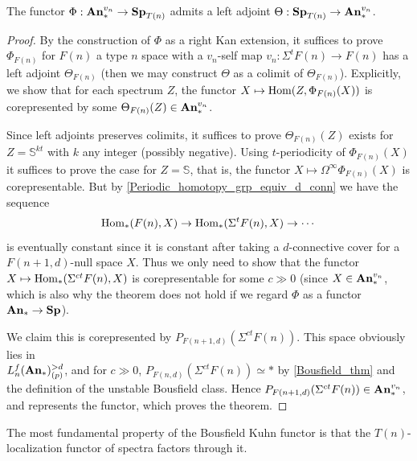 	\begin{thm}\label{Bousfield_Kuhn_adjoint}
		The functor $\Phi:\mathbf{An}_*^{v_n}\to\mathbf{Sp}_{T(n)}$ admits a left adjoint $\Theta:\mathbf{Sp}_{T(n)}\to\mathbf{An}_*^{v_n}$. 
	\end{thm}
	\begin{proof}
		By the construction of $\Phi$ as a right Kan extension, it suffices to prove $\Phi_{F(n)}$ for $F(n)$ a type $n$ space with a $v_n$-self map $v_n:\Sigma^tF(n)\to F(n)$ has a left adjoint $\Theta_{F(n)}$ (then we may construct $\Theta$ as a colimit of $\Theta_{F(n)}$). Explicitly, we show that for each spectrum $Z$, the functor $X\mapsto\operatorname{\mathrm{Hom}}(Z,\Phi_{F(n)}(X))$ is corepresented by some $\Theta_{F(n)}(Z)\in\mathbf{An}_*^{v_n}$. 

		Since left adjoints preserves colimits, it suffices to prove $\Theta_{F(n)}(Z)$ exists for $Z=\mathbb{S}^{kt}$ with $k$ any integer (possibly negative). Using $t$-periodicity of $\Phi_{F(n)}(X)$ it suffices to prove the case for $Z=\mathbb{S}$, that is, the functor $X\mapsto\Omega^\infty\Phi_{F(n)}(X)$ is corepresentable. But by \cref{Periodic_homotopy_grp_equiv_d_conn} we have the sequence 
		\[ \operatorname{\mathrm{Hom}}_*(F(n),X)\to\operatorname{\mathrm{Hom}}_*(\Sigma^tF(n),X)\to\cdots \]
		is eventually constant since it is constant after taking a $d$-connective cover for a $F(n+1,d)$-null space $X$. Thus we only need to show that the functor $X\mapsto\operatorname{\mathrm{Hom}}_*(\Sigma^{ct}F(n),X)$ is corepresentable for some $c\gg0$ (since $X\in\mathbf{An}_*^{v_n}$, which is also why the theorem does not hold if we regard $\Phi$ as a functor $\mathbf{An}_*\to\mathbf{Sp}$). 

		We claim this is corepresented by $P_{F(n+1,d)}(\Sigma^{ct}F(n))$. This space obviously lies in \\
		$L_n^f(\mathbf{An}_*)_{(p)}^{>d}$, and for $c\gg0$, $P_{F(n,d)}(\Sigma^{ct}F(n))\simeq*$ by \cref{Bousfield_thm} and the definition of the unstable Bousfield class. Hence $P_{F(n+1,d)}(\Sigma^{ct}F(n))\in\mathbf{An}_*^{v_n}$, and represents the functor, which proves the theorem. 
	\end{proof}

	The most fundamental property of the Bousfield Kuhn functor is that the $T(n)$-localization functor of spectra factors through it. 
	
